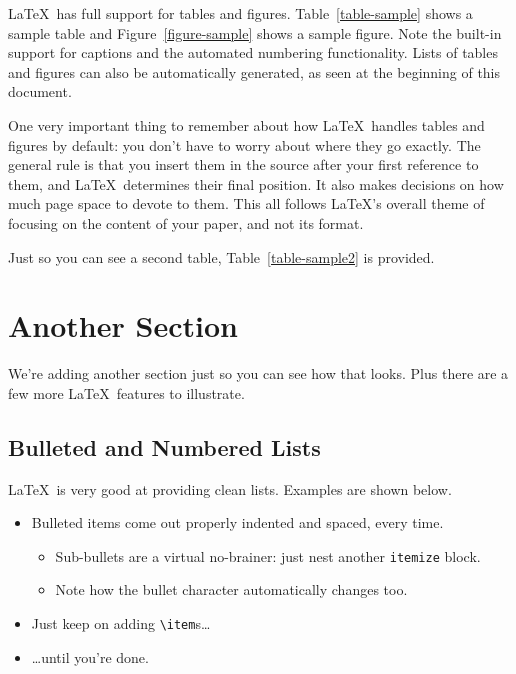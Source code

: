 \documentclass{article}
\begin{document}
\LaTeX\ has full support for tables and figures.  Table~\ref{table-sample} shows a sample table and Figure~\ref{figure-sample} shows a sample figure.  Note the built-in support for captions and the automated numbering functionality.  Lists of tables and figures can also be automatically generated, as seen at the beginning of this document.




One very important thing to remember about how \LaTeX\ handles tables and figures by default: you don't have to worry about where they go exactly.  The general rule is that you insert them in the source after your first reference to them, and \LaTeX\ determines their final position.  It also makes decisions on how much page space to devote to them.  This all follows \LaTeX's overall theme of focusing on the content of your paper, and not its format.

Just so you can see a second table, Table~\ref{table-sample2} is provided.


\section{Another Section}

We're adding another section just so you can see how that looks.  Plus there are a few more \LaTeX\ features to illustrate.

\subsection{Bulleted and Numbered Lists}

\LaTeX\ is very good at providing clean lists.  Examples are shown below.

\begin{itemize}
\item Bulleted items come out properly indented and spaced, every time.

\begin{itemize}
\item Sub-bullets are a virtual no-brainer: just nest another \verb!itemize! block.
\item Note how the bullet character automatically changes too.
\end{itemize}

\item Just keep on adding \verb!\item!s\ldots

\item \ldots until you're done.
\end{itemize}
\end{document}
